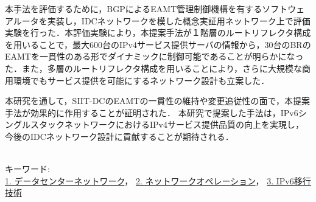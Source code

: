 本手法を評価するために，BGPによるEAMT管理制御機構を有するソフトウェアルータを実装し，IDCネットワークを模した概念実証用ネットワーク上で評価実験を行った．本評価実験により，本提案手法が１階層のルートリフレクタ構成を用いることで，最大600台のIPv4サービス提供サーバの情報から，30台のBRのEAMTを一貫性のある形でダイナミックに制御可能であることが明らかになった．また，多層のルートリフレクタ構成を用いることにより，さらに大規模な商用環境でもサービス提供を可能にするネットワーク設計も立案した．

本研究を通して，SIIT-DCのEAMTの一貫性の維持や変更追従性の面で，本提案手法が効果的に作用することが証明された．
本研究で提案した手法は，IPv6シングルスタックネットワークにおけるIPv4サービス提供品質の向上を実現し，今後のIDCネットワーク設計に貢献することが期待される．



~ \\

キーワード:\\
\underline{1. データセンターネットワーク}，
\underline{2. ネットワークオペレーション}，
\underline{3. IPv6移行技術}
\begin{flushright}
\dept \\
\author
\end{flushright}
